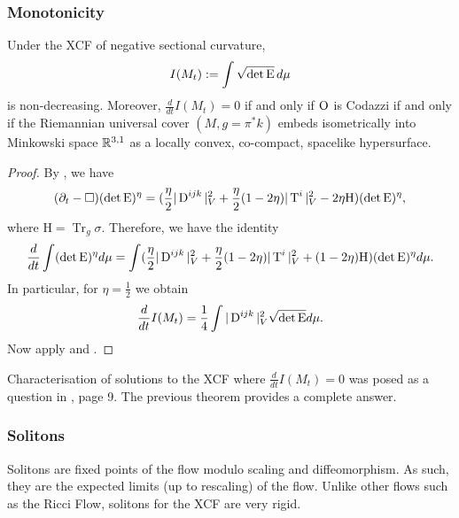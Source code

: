 \documentclass[a4paper,12pt]{amsart}
\begin{document}
\subsubsection{Monotonicity}
\label{subsec:xcf_volume}

\begin{thm}
\label{thm:volume_monotonicity}
Under the XCF of negative sectional curvature,
\[
I(M_t):=\int \sqrt{\det\operatorname{E}}\,d\mu
\]
is non-decreasing. Moreover, \(\frac{d}{dt} I(M_t)= 0\) if and only if \(\operatorname{O}\) is Codazzi if and only if the Riemannian universal cover \((M, g = \pi^{\ast} k)\) embeds isometrically into Minkowski space \(\mathbb{R}^{3,1}\) as a locally convex, co-compact, spacelike hypersurface.
\end{thm}
\begin{proof}
By \cite[Proposition 9]{MR2055396}, we have
\begin{align}
(\partial_t-\Box)(\det\operatorname{E})^\eta=(\frac{\eta}{2}|\operatorname{D}^{ijk}|_V^2+\frac{\eta}{2}(1-2\eta)|\operatorname{T}^i|^2_V-2\eta\mathrm{H})(\det\operatorname{E})^\eta,
\end{align}
where $\mathrm{H}=\operatorname{Tr}_g\sigma.$ Therefore, we have the identity
\begin{align}
\frac{d}{dt}\int(\det\operatorname{E})^\eta d\mu=\int (\frac{\eta}{2}|\operatorname{D}^{ijk}|_V^2+\frac{\eta}{2}(1-2\eta)|\operatorname{T}^i|^2_V+(1-2\eta)\mathrm{H})(\det\operatorname{E})^\eta d\mu.
\end{align}
In particular, for $\eta=\frac{1}{2}$ we obtain
\begin{align}
\frac{d}{dt}I(M_t)=\frac{1}{4}\int |\operatorname{D}^{ijk}|_V^2\sqrt{\det\operatorname{E}}d\mu.
\end{align}
Now apply  and .
\end{proof}
\begin{rem}
Characterisation of solutions to the XCF where \(\frac{d}{dt} I(M_t) = 0\) was posed as a question in \cite{MR2055396}, page 9. The previous theorem provides a complete answer.
\end{rem}



\subsubsection{Solitons}
\label{subsec:xcf_solitons}

Solitons are fixed points of the flow modulo scaling and diffeomorphism. As such, they are the expected limits (up to rescaling) of the flow. Unlike other flows such as the Ricci Flow, solitons for the XCF are very rigid.
\end{document}
